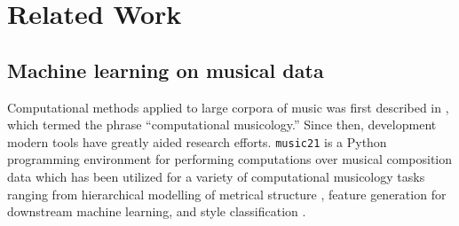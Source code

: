 \documentclass[dissertation.tex]{subfiles}
\begin{document}
\chapter{Related Work}




\section{Machine learning on musical data}

Computational methods applied to large corpora of music was first described in
\cite{coutinho2005computational}, which termed the phrase ``computational
musicology.'' Since then, development modern tools have greatly aided research
efforts. \texttt{music21} \cite{Scott2015} is a Python programming environment
for performing computations over musical composition data which has been
utilized for a variety of computational musicology tasks ranging from
hierarchical modelling of metrical structure \cite{ariza2010modeling}, feature
generation for downstream machine learning\cite{Cuthbert2011}, and style
classification \cite{Herlands2014}.
\end{document}
